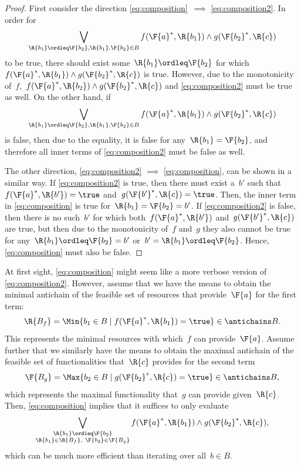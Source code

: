 \begin{proof}
First consider the direction \cref{eq:composition}~$\implies$ \cref{eq:composition2}. In order for
\begin{equation}
    \bigvee_{\R{b_1}\ordleq\F{b_2}, \R{b_1},\F{b_2}\in B} f(\F{a}^*,\R{b_1}) \wedge g(\F{b_2}^*,\R{c})
\end{equation}
to be true, there should exist some~$\R{b_1}\ordleq \F{b_2}$ for which~$f(\F{a}^*,\R{b_1}) \wedge g(\F{b_2}^*,\R{c})$ is true. However, due to the monotonicity of~$f$,~$f(\F{a}^*,\R{b_2}) \wedge g(\F{b_2}^*,\R{c})$ and \cref{eq:composition2} must be true as well. On the other hand, if
\begin{equation}
    \bigvee_{\R{b_1}\ordleq\F{b_2}, \R{b_1},\F{b_2}\in B} f(\F{a}^*,\R{b_1}) \wedge g(\F{b_2}^*,\R{c})
\end{equation}
is false, then due to the equality, it is false for any~$\R{b_1}=\F{b_2}$, and therefore all inner terms of \cref{eq:composition2} must be false as well.

The other direction, \cref{eq:composition2} $\implies$ \cref{eq:composition}, can be shown in a similar way. If \cref{eq:composition2} is true, then there must exist a~$b'$ such that~$f(\F{a}^*, \R{b'})=\true$ and~$g(\F{b'}^*, \R{c})=\true$. Then, the inner term in \cref{eq:composition} is true for~$\R{b_1}=\F{b_2}=b'$. If \cref{eq:composition2} is false, then there is no such~$b'$ for which both~$f(\F{a}^*, \R{b'})$ and~$g(\F{b'}^*, \R{c})$ are true, but then due to the monotonicity of~$f$ and~$g$ they also cannot be true for any~$\R{b_1} \ordleq \F{b_2} = b'$ or~$b'=\R{b_1} \ordleq \F{b_2}$. Hence, \cref{eq:composition} must also be false.
\end{proof}
\begin{remark}
At first sight, \cref{eq:composition} might seem like a more verbose version of \cref{eq:composition2}. However, assume that we have the means to obtain the minimal antichain of the feasible set of resources that provide~$\F{a}$ for the first term:
\begin{equation}
    \R{B_f} = \Min \{b_1\in B \mid f(\F{a}^*,\R{b_1})=\true\} \in \antichains B.
\end{equation}
This represents the minimal resources with which~$f$ can provide~$\F{a}$. Assume further that we similarly have the means to obtain the maximal antichain of the feasible set of functionalities that~$\R{c}$ provides for the second term
\begin{equation}
    \F{B_g} = \Max \{b_2\in B \mid g(\F{b_2}^*,\R{c})=\true\} \in \antichains B,
\end{equation}
which represents the maximal functionality that~$g$ can provide given~$\R{c}$. Then, \cref{eq:composition} implies that it suffices to only evaluate
\begin{equation}
    \bigvee_{\substack{\R{b_1}\ordleq\F{b_2} \\ \R{b_1}\in \R{B_f},~ \F{b_2}\in\F{B_g} }} f(\F{a}^*,\R{b_1}) \wedge g(\F{b_2}^*,\R{c}),
\end{equation}
which can be much more efficient than iterating over all~$b\in B$.
\end{remark}

